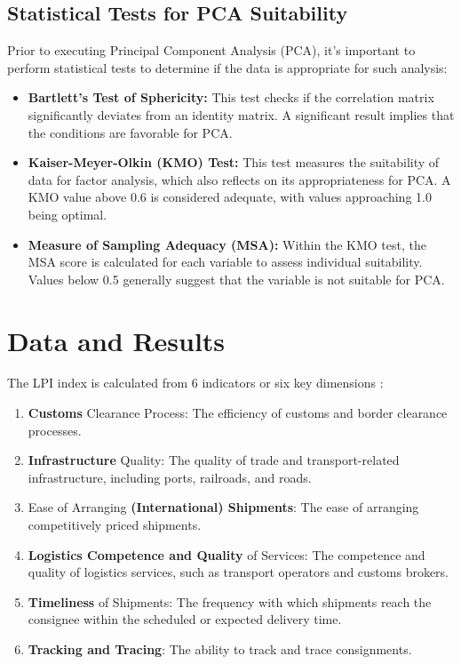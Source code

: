 \documentclass[sigconf]{acmart}
\begin{document}
\subsection{Statistical Tests for PCA Suitability}

Prior to executing Principal Component Analysis (PCA), it's important to perform statistical tests to determine if the data is appropriate for such analysis:

\begin{itemize}
    \item \textbf{Bartlett’s Test of Sphericity:} This test checks if the correlation matrix significantly deviates from an identity matrix. A significant result implies that the conditions are favorable for PCA.
    \item \textbf{Kaiser-Meyer-Olkin (KMO) Test:} This test measures the suitability of data for factor analysis, which also reflects on its appropriateness for PCA. A KMO value above 0.6 is considered adequate, with values approaching 1.0 being optimal.
    \item \textbf{Measure of Sampling Adequacy (MSA):} Within the KMO test, the MSA score is calculated for each variable to assess individual suitability. Values below 0.5 generally suggest that the variable is not suitable for PCA.
\end{itemize}

\section{Data and Results}

The LPI \cite{WB} index is calculated from 6 indicators or six key dimensions \cite{WBreport2016,WBreport2018}:
\begin{enumerate}
    \item \textbf{Customs} Clearance Process: The efficiency of customs and border clearance processes.
    \item \textbf{Infrastructure} Quality: The quality of trade and transport-related infrastructure, including ports, railroads, and roads.
    \item Ease of Arranging \textbf{(International) Shipments}: The ease of arranging competitively priced shipments.
    \item \textbf{Logistics Competence and Quality } of Services: The competence and quality of logistics services, such as transport operators and customs brokers.
    \item \textbf{Timeliness} of Shipments: The frequency with which shipments reach the consignee within the scheduled or expected delivery time.
    \item \textbf{Tracking and Tracing}: The ability to track and trace consignments.
\end{enumerate}
\end{document}
